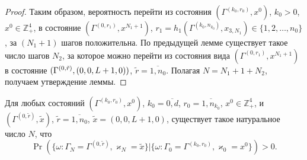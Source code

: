 \documentclass[a4paper,12pt,russian]{extarticle}
\begin{document}
\begin{proof}
Таким образом, вероятность перейти из состояния $(\Gamma^{(k_0,r_0)},x^0)$, $k_0>0$, $x^0 \in \mathbb{Z}_+^4$, в состояние $(\Gamma^{(0,r_1)},x^{N_1+1})$, $r_1=h_1(\Gamma^{(k_0,n_{k_0})},x_{3,N_1}) \in \{1, 2, \ldots, n_0\}$,
за $(N_1+1)$ шагов положительна. По предыдущей лемме существует такое число шагов $N_2$, за которое можно перейти из состояния вида $(\Gamma^{(0,r_1)},x^{N_1+1})$ в состояние $(\Gamma^{(0,\tilde{r})},(0,0,L\hm+1,0))$, $\tilde{r}=\overline{1,n_0}$. Полагая $N=N_1+1+N_2$, получаем утверждение леммы.
\end{proof}

\begin{lemma}\label{all:in:one}
Для любых состояний $(\Gamma^{(k_0,r_0)},x^0)$, $k_0=\overline{0,d}$, $r_0=\overline{1,n_{k_0}}$, $x^0 \in \mathbb{Z}_+^4$, и $(\Gamma^{(0,\tilde{r})},\tilde{x})$, $\tilde{r} = \overline{1,n_0}$, $\tilde{x}=(0,0,L+1,0)$, существует такое натуральное число $N$, что 
\begin{equation*}
\Pr(\{\omega\colon \Gamma_{N}=\Gamma^{(0,\tilde{r} )}, \varkappa_{N}=\tilde{x}\}|
\{\omega\colon \Gamma_{0}=\Gamma^{(k_0,r_0)}, \varkappa_{0}=x^0\})>0.
\end{equation*}
\end{lemma}
\end{document}
